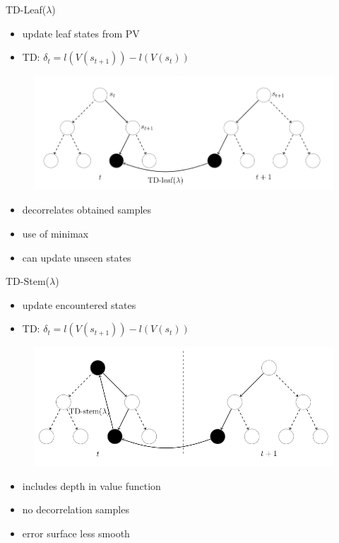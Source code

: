 \documentclass{beamer}
\newcommand\pro{\item[\color{green}$+$]}
\newcommand\con{\item[\color{red}$-$]}
\begin{document}
\begin{frame}{TD-Leaf($\lambda$)}
	\begin{itemize}
		\item update leaf states from PV
		\item TD: $\delta_t=l(V(s_{t+1}))-l(V(s_t))$
	\end{itemize}
	\begin{figure}
		\centering
		\includegraphics[scale=0.3]{abstracts/tdl}
	\end{figure}
	\begin{itemize}
		\pro decorrelates obtained samples
		\pro use of minimax
		\con can update unseen states
	\end{itemize}
\end{frame}

\begin{frame}{TD-Stem($\lambda$)}
	\begin{itemize}
		\item update encountered states
		\item TD: $\delta_t=l(V(s_{t+1}))-l(V(s_t))$
	\end{itemize}
	\begin{figure}
		\centering
		\includegraphics[scale=0.3]{abstracts/tds}
	\end{figure}
	\begin{itemize}
		\pro includes depth in value function
		\con no decorrelation samples
		\con error surface less smooth
	\end{itemize}
\end{frame}
\end{document}
